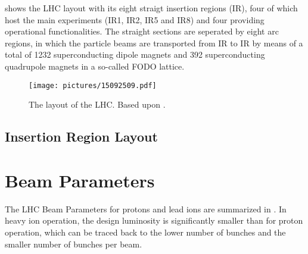  shows the LHC layout with its eight straigt insertion regions (IR), four of which host the main experiments (IR1, IR2, IR5 and IR8) and four providing operational functionalities. The straight sections are seperated by eight arc regions, in which the particle beams are transported from IR to IR by means of a total of 1232 superconducting dipole magnets and 392 superconducting quadrupole magnets in a so-called FODO lattice. 



  \begin{figure}[t]
  \centering
  \texttt{[image: pictures/15092509.pdf]}
  \caption{The layout of the LHC. Based upon \cite{Bruning2012705,CERN-2004-003-V1}. }  
  \label{pic:15032201}
  \end{figure}


\subsection{Insertion Region Layout}




\section{Beam Parameters}


The LHC Beam Parameters for protons and lead ions are summarized in . In heavy ion operation, the design luminosity is significantly smaller than for proton operation, which can be traced back to the lower number of bunches and the smaller number of bunches per beam. 



